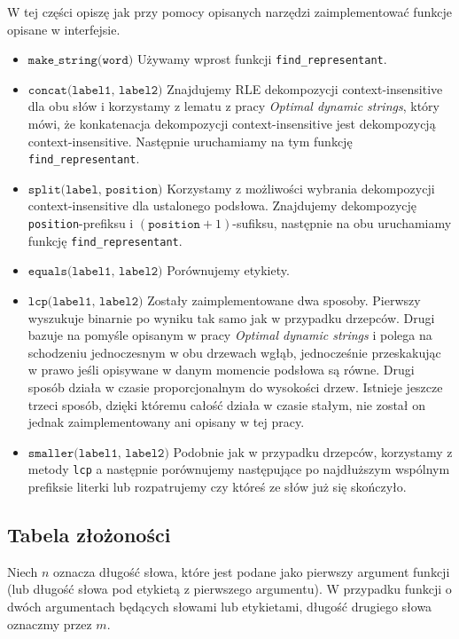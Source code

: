 \documentclass[declaration,shortabstract]{iithesis}
\theoremstyle{definition} \newtheorem{definition}{Definicja}[chapter]
\theoremstyle{remark} \newtheorem{remark}[definition]{Obserwacja}
\theoremstyle{plain} \newtheorem{theorem}[definition]{Twierdzenie}
\theoremstyle{remark} \newtheorem{example}{Przykład}[definition]
\theoremstyle{plain} \newtheorem{lemma}[definition]{Lemat}
\begin{document}
W tej części opiszę jak przy pomocy opisanych narzędzi zaimplementować funkcje opisane w interfejsie.
\begin{itemize}
    \item $\texttt{make\_string(word)}$ Używamy wprost funkcji \texttt{find\_representant}.
    \item $\texttt{concat(label1, label2)}$ Znajdujemy RLE dekompozycji context-insensitive dla obu słów i korzystamy z lematu z pracy \textit{Optimal dynamic strings}, który mówi, że konkatenacja dekompozycji context-insensitive jest dekompozycją context-insensitive. Następnie uruchamiamy na tym funkcję \texttt{find\_representant}.
    \item $\texttt{split(label, position)}$ Korzystamy z możliwości wybrania dekompozycji context-insensitive dla ustalonego podsłowa. Znajdujemy dekompozycję \texttt{position}-prefiksu i $(\texttt{position} + 1)$-sufiksu, następnie na obu uruchamiamy funkcję \texttt{find\_representant}. 
    \item $\texttt{equals(label1, label2)}$ Porównujemy etykiety.
    \item $\texttt{lcp(label1, label2)}$ Zostały zaimplementowane dwa sposoby. Pierwszy wyszukuje binarnie po wyniku tak samo jak w przypadku drzepców. Drugi bazuje na pomyśle opisanym w pracy \textit{Optimal dynamic strings} i polega na schodzeniu jednoczesnym w obu drzewach wgłąb, jednocześnie przeskakując w prawo jeśli opisywane w danym momencie podsłowa są równe. Drugi sposób działa w czasie proporcjonalnym do wysokości drzew. Istnieje jeszcze trzeci sposób, dzięki któremu całość działa w czasie stałym, nie został on jednak zaimplementowany ani opisany w tej pracy.
    \item $\texttt{smaller(label1, label2)}$ Podobnie jak w przypadku drzepców, korzystamy z metody \texttt{lcp} a następnie porównujemy następujące po najdłuższym wspólnym prefiksie literki lub rozpatrujemy czy któreś ze słów już się skończyło. 
\end{itemize}

\subsection{Tabela złożoności}

Niech $n$ oznacza długość słowa, które jest podane jako pierwszy argument funkcji (lub długość słowa pod etykietą z pierwszego argumentu). W przypadku funkcji o dwóch argumentach będących słowami lub etykietami, długość drugiego słowa oznaczmy przez $m$.
\end{document}
